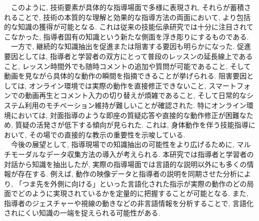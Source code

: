 　このように, 技術要素が具体的な指導場面で多様に表現され, それらが蓄積されることで, 技術の本質的な理解と効果的な指導方法の両面において, より包括的な知識の獲得が可能となる. これは従来の技能伝承研究では十分に注目されてこなかった, 指導者固有の知識という新たな側面を浮き彫りにするものである.\\
　一方で, 継続的な知識抽出を促進または阻害する要因も明らかになった. 促進要因としては, 指導者と学習者の双方にとって普段のレッスンの延長線上であること, レッスン時間外でも随時コメントの追加や質問が可能であること, そして動画を見ながら具体的な動作の瞬間を指摘できることが挙げられる. 阻害要因としては, オンライン環境では実際の動作を直接修正できないこと, スマートフォンでの動画再生とコメント入力の切り替えが煩雑であること, そして日常的なシステム利用のモチベーション維持が難しいことが確認された. 特にオンライン環境においては, 対面指導のような即座の質疑応答や直接的な動作修正が困難なため, 質疑の活発さが低下する傾向が見られた. これは, 身体動作を伴う技能指導において, その場での直接的な教示の重要性を示唆している.\\
　今後の展望として, 指導現場での知識抽出の可能性をより広げるために, マルチモーダルなデータ収集方法の導入が考えられる. 本研究では指導者と学習者の対話から知識を抽出したが, 実際の指導場面では言語的な説明以外にも多くの情報が存在する. 例えば, 動作の映像データと指導者の説明を同期させた分析により, 「つま先を外側に向ける」といった言語化された指示が実際の動作のどの局面でどのように実現されているかを定量的に把握することが可能となる. また, 指導者のジェスチャーや視線の動きなどの非言語情報を分析することで, 言語化されにくい知識の一端を捉えられる可能性がある.


